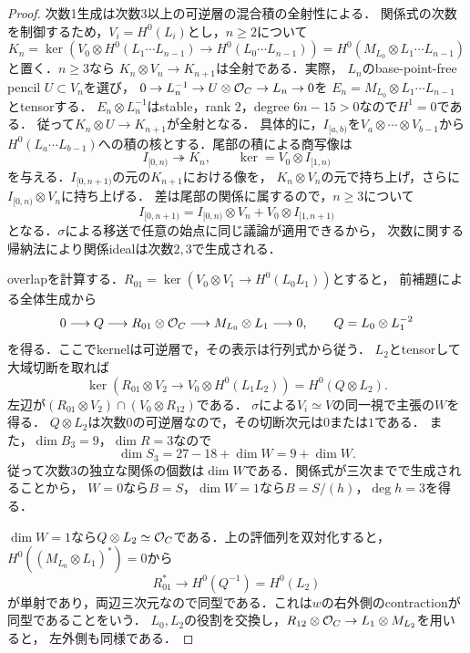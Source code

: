 \documentclass[11pt,a4paper]{ltjsarticle}
\begin{document}
\begin{proof}
次数1生成は次数3以上の可逆層の混合積の全射性による．
関係式の次数を制御するため，$V_i=H^0(L_i)$とし，$n\geq2$について
\[
 K_n=\ker\left(V_0\otimes H^0(L_1\cdots L_{n-1})
 \longrightarrow H^0(L_0\cdots L_{n-1})\right)
 =H^0(M_{L_0}\otimes L_1\cdots L_{n-1})
\]
と置く．$n\geq3$なら
$K_n\otimes V_n\to K_{n+1}$は全射である．実際，
$L_n$のbase-point-free pencil $U\subset V_n$を選び，
$0\to L_n^{-1}\to U\otimes\mathcal O_C\to L_n\to0$を
$E_n=M_{L_0}\otimes L_1\cdots L_{n-1}$とtensorする．
$E_n\otimes L_n^{-1}$はstable，rank $2$，degree $6n-15>0$なので$H^1=0$である．
従って$K_n\otimes U\to K_{n+1}$が全射となる．
具体的に，$I_{[a,b)}$を$V_a\otimes\cdots\otimes V_{b-1}$から
$H^0(L_a\cdots L_{b-1})$への積の核とする．尾部の積による商写像は
\[
 I_{[0,n)}\twoheadrightarrow K_n,
 \qquad
 \ker=V_0\otimes I_{[1,n)}
\]
を与える．$I_{[0,n+1)}$の元の$K_{n+1}$における像を，
$K_n\otimes V_n$の元で持ち上げ，さらに$I_{[0,n)}\otimes V_n$に持ち上げる．
差は尾部の関係に属するので，$n\geq3$について
\[
 I_{[0,n+1)}=
 I_{[0,n)}\otimes V_n+V_0\otimes I_{[1,n+1)}
\]
となる．$\sigma$による移送で任意の始点に同じ議論が適用できるから，
次数に関する帰納法により関係idealは次数$2,3$で生成される．

overlapを計算する．$R_{01}=\ker(V_0\otimes V_1\to H^0(L_0L_1))$とすると，
前補題による全体生成から
\[
 0\longrightarrow Q\longrightarrow R_{01}\otimes\mathcal O_C
 \longrightarrow M_{L_0}\otimes L_1\longrightarrow0,
 \qquad Q=L_0\otimes L_1^{-2}
\]
を得る．ここでkernelは可逆層で，その表示は行列式から従う．
$L_2$とtensorして大域切断を取れば
\[
 \ker\left(R_{01}\otimes V_2\longrightarrow
 V_0\otimes H^0(L_1L_2)\right)
 =H^0(Q\otimes L_2).
\]
左辺が$(R_{01}\otimes V_2)\cap(V_0\otimes R_{12})$である．
$\sigma$による$V_i\simeq V$の同一視で主張の$W$を得る．
$Q\otimes L_2$は次数0の可逆層なので，その切断次元は$0$または$1$である．
また，$\dim B_3=9$，$\dim R=3$なので
\[
 \dim S_3=27-18+\dim W=9+\dim W.
\]
従って次数3の独立な関係の個数は$\dim W$である．関係式が三次までで生成されることから，
$W=0$なら$B=S$，$\dim W=1$なら$B=S/(h)$，$\deg h=3$を得る．

$\dim W=1$なら$Q\otimes L_2\simeq\mathcal O_C$である．上の評価列を双対化すると，
$H^0((M_{L_0}\otimes L_1)^*)=0$から
\[
 R_{01}^*\longrightarrow H^0(Q^{-1})=H^0(L_2)
\]
が単射であり，両辺三次元なので同型である．これは$w$の右外側のcontractionが同型であることをいう．
$L_0,L_2$の役割を交換し，$R_{12}\otimes\mathcal O_C\to L_1\otimes M_{L_2}$を用いると，
左外側も同様である．


\end{proof}
\end{document}
